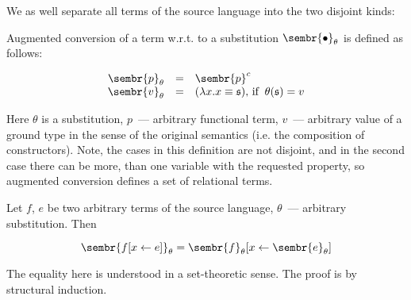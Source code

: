 \begin{definition}
\normalfont
We as well separate all terms of the source language into the two disjoint kinds:


\end{definition}

\begin{definition}
\normalfont Augmented conversion of a term w.r.t. to a substitution $\sembr{\bullet}_\theta$ is defined as follows: 

$$
\begin{array}{rcl}
\sembr{p}_\theta&=&\sembr{p}^c\\
\sembr{v}_\theta&=&(\lambda x.x\equiv\mathfrak{s}),\,\mbox{if}\;\;\theta(\mathfrak s)=v
\end{array}
$$

Here $\theta$ is a substitution, $p$~--- arbitrary functional term, $v$~--- arbitrary value of a
ground type in the sense of the original semantics (i.e. the composition of constructors). Note, the
cases in this definition are not disjoint, and in the second case there can be more, than one
variable with the requested property, so augmented conversion defines a set of relational terms.
\end{definition}

\begin{lemma}
\label{substitution}
\normalfont Let $f$, $e$ be two arbitrary terms of the source language, $\theta$~--- arbitrary
substitution. Then

$$
\sembr{f[x\gets e]}_\theta=\sembr{f}_\theta[x\gets\sembr{e}_\theta]
$$

The equality here is understood in a set-theoretic sense. The proof is by structural 
induction.
\end{lemma}

